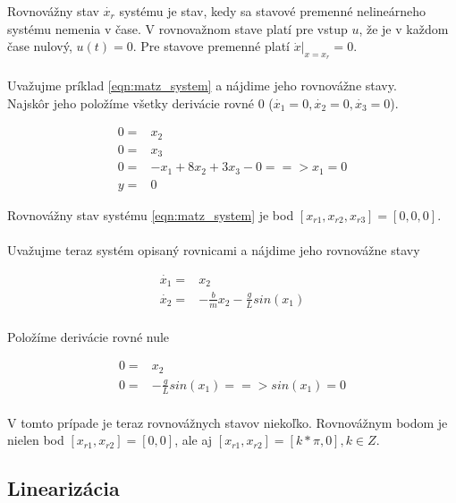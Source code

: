 \documentclass[../main.tex]{subfiles}
\begin{document}
Rovnovážny stav $\dot{x_r}$ systému je stav, kedy sa stavové premenné nelineárneho systému nemenia v čase. V rovnovažnom stave platí pre vstup $u$, že je v každom čase nulový, $u(t)=0$. Pre stavove premenné platí $\dot{x}|_{x = x_r} = 0$.\\\\
Uvažujme príklad \ref{eqn:matz_system} a nájdime jeho rovnovážne stavy.\\Najskôr jeho položíme všetky derivácie rovné 0 ($\dot{x_1} = 0,\dot{x_2} = 0,\dot{x_3} = 0$).

\begin{equation}
	\begin{split}
		0 =& x_2 \\
		0 =& x_3 \\
		0 =& -x_1 + 8x_2 + 3x_3 - 0 ==> x_1 = 0 \\
		y =& 0
	\end{split}
	\label{eqn:rovnovazny_stav1}
\end{equation}

Rovnovážny stav systému \ref{eqn:matz_system} je bod $[x_{r1},x_{r2},x_{r3}] = [0,0,0]$.\\\\
Uvažujme teraz systém opisaný rovnicami a nájdime jeho rovnovážne stavy

\begin{equation}
	\begin{split}
		\dot{x_1} =& x_2 \\
		\dot{x_2} =& -\frac{b}{m}x_2-\frac{g}{L}sin(x_1) \\
	\end{split}
	\label{eqn:rovnovazny_stav2}
\end{equation}

Položíme derivácie rovné nule 

\begin{equation}
	\begin{split}
		0 =& x_2 \\
		0 =& -\frac{g}{L}sin(x_1) ==> sin(x_1) = 0\\
	\end{split}
	\label{eqn:rovnovazny_stav22}
\end{equation}

V tomto prípade je teraz rovnovážnych stavov niekoľko. Rovnovážnym bodom je nielen bod $[x_{r1},x_{r2}] = [0,0]$, ale aj $[x_{r1},x_{r2}] = [k*\pi,0],k \in Z$.
	
\subsection{Linearizácia}
\end{document}
